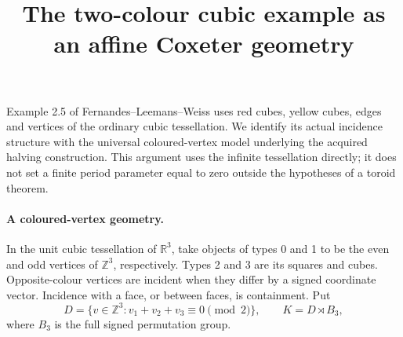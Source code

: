 \documentclass[11pt]{article}
\title{The two-colour cubic example as an affine Coxeter geometry}
\author{}\date{}
\begin{document}
\maketitle
Example 2.5 of Fernandes--Leemans--Weiss uses red cubes, yellow cubes,
edges and vertices of the ordinary cubic tessellation. We identify its
actual incidence structure with the universal coloured-vertex model
underlying the acquired halving construction. This argument uses the
infinite tessellation directly; it does not set a finite period parameter
equal to zero outside the hypotheses of a toroid theorem.

\paragraph{A coloured-vertex geometry.}
In the unit cubic tessellation of $\mathbb R^3$, take objects of types
0 and 1 to be the even and odd vertices of $\mathbb Z^3$, respectively.
Types 2 and 3 are its squares and cubes. Opposite-colour vertices are
incident when they differ by a signed coordinate vector. Incidence
with a face, or between faces, is containment. Put
\[
D=\{v\in\mathbb Z^3:v_1+v_2+v_3\equiv0\pmod2\},
\qquad K=D\rtimes B_3,
\]
where $B_3$ is the full signed permutation group.
\end{document}
